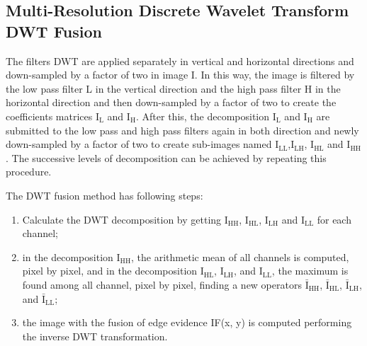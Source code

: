 \documentclass[journal]{IEEEtran}
\begin{document}
\subsection{Multi-Resolution Discrete Wavelet Transform DWT Fusion~\cite{n_r}}  
The filters DWT are applied separately in vertical and horizontal directions and down-sampled by a factor of two in image I. In this way, the image is filtered by the low pass filter L in the vertical direction and the high pass filter H in the horizontal direction and then down-sampled by a factor of two to create the coefficients matrices $\text{I}_\text{L}$ and $\text{I}_\text{H}$. After this, the decomposition $\text{I}_\text{L}$ and $\text{I}_\text{H}$ are submitted to the low pass and high pass filters again  in both direction and newly down-sampled by a factor of two to create sub-images named $\text{I}_\text{LL}$,$\text{I}_\text{LH}$, $\text{I}_\text{HL}$ and $\text{I}_\text{HH}$. The successive levels of decomposition can be achieved by repeating this procedure.

The DWT fusion method has following steps:
\begin{enumerate}
\item Calculate the DWT decomposition by getting $\text{I}_\text{HH}$, $\text{I}_\text{HL}$, $\text{I}_\text{LH}$ and $\text{I}_\text{LL}$ for each channel;
\item in the decomposition $\text{I}_\text{HH}$, the arithmetic mean of all channels is computed, pixel by pixel, and in the decomposition $\text{I}_\text{HL}$, $\text{I}_\text{LH}$, and $\text{I}_\text{LL}$, the maximum is found among all channel, pixel by pixel, finding a new operators $\bar{\text{I}}_\text{HH}$, $\bar{\text{I}}_\text{HL}$, $\bar{\text{I}}_\text{LH}$, and $\bar{\text{I}}_\text{LL}$;
\item the image with the fusion of edge evidence IF(x, y) is computed performing the inverse DWT transformation.
\end{enumerate}
\end{document}
